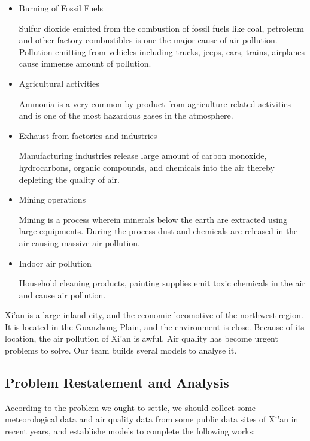 \documentclass[a4paper,11pt]{article}
\begin{document}
\begin{itemize}
    \item Burning of Fossil Fuels
    \par Sulfur dioxide emitted from the combustion of fossil fuels like coal, petroleum and other factory combustibles is one the major cause of air pollution. Pollution emitting from vehicles including trucks, jeeps, cars, trains, airplanes cause immense amount of pollution. 
    \item Agricultural activities
    \par Ammonia is a very common by product from agriculture related activities and is one of the most hazardous gases in the atmosphere.
    \item Exhaust from factories and industries
    \par Manufacturing industries release large amount of carbon monoxide, hydrocarbons, organic compounds, and chemicals into the air thereby depleting the quality of air. 
    \item Mining operations
    \par Mining is a process wherein minerals below the earth are extracted using large equipments. During the process dust and chemicals are released in the air causing massive air pollution. 
    \item Indoor air pollution
    \par Household cleaning products, painting supplies emit toxic chemicals in the air and cause air pollution. 
 \end{itemize}

 \par Xi'an is a large inland city, and the economic locomotive of the northwest region. It is located in the Guanzhong Plain, and the environment is close. Because of its location, the air pollution of Xi'an is awful. Air quality has become urgent problems to solve. Our team builds sveral models to analyse it.

 
\subsection{Problem Restatement and Analysis}
\par According to the problem we ought to settle, we should collect some meteorological data and air quality data from some public data sites of Xi'an in recent years, and establishe models to complete the following works:
\end{document}
